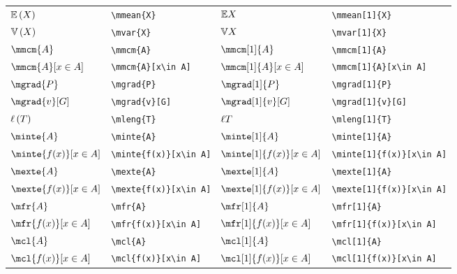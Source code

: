 \documentclass[10pt, a4paper]{article}
\newcommand{\ds}{\displaystyle}
\newcommand{\mmean}[2][0]{
	\ifthenelse{ \equal{#1}{0} }{\mathbb{E}\left( #2 \right)}{\mathbb{E}{#2}}
}
\newcommand{\mvar}[2][0]{
	\ifthenelse{ \equal{#1}{0} }{\mathbb{V}\left( #2 \right)}{\mathbb{V}{#2}}
}
\newcommand{\mleng}[2][0]{
	\ifthenelse{ \equal{#1}{0} }{\ell\left( #2 \right)}{\ell{#2}}
}
\begin{document}
\begin{center}
\begin{tabular}{ll|ll}
		$ \mmean{X} $ & \texttt{\textbackslash mmean\{X\}} & $ \mmean[1]{X} $ & \texttt{\textbackslash mmean[1]\{X\}}\\
		$ \mvar{X} $ & \texttt{\textbackslash mvar\{X\}} & $ \mvar[1]{X} $ & \texttt{\textbackslash mvar[1]\{X\}}\\
		$ \mmcm{A} $ & \texttt{\textbackslash mmcm\{A\}} & $ \mmcm[1]{A} $ & \texttt{\textbackslash mmcm[1]\{A\}}\\
		$ \ds\mmcm{A}[x\in A] $ & \texttt{\textbackslash mmcm\{A\}[x\textbackslash in A]} & $ \ds\mmcm[1]{A}[x\in A] $ & \texttt{\textbackslash mmcm[1]\{A\}[x\textbackslash in A]}\\
		$ \mgrad{P} $ & \texttt{\textbackslash mgrad\{P\}} & $ \mgrad[1]{P} $ & \texttt{\textbackslash mgrad[1]\{P\}}\\
		$ \mgrad{v}[G] $ & \texttt{\textbackslash mgrad\{v\}[G]} & $ \mgrad[1]{v}[G] $ & \texttt{\textbackslash mgrad[1]\{v\}[G]}\\
		$ \mleng{T} $ & \texttt{\textbackslash mleng\{T\}} & $ \mleng[1]{T} $ & \texttt{\textbackslash mleng[1]\{T\}}\\
		$ \minte{A} $ & \texttt{\textbackslash minte\{A\}} & $ \minte[1]{A} $ & \texttt{\textbackslash minte[1]\{A\}}\\
		$ \ds\minte{f(x)}[x\in A] $ & \texttt{\textbackslash minte\{f(x)\}[x\textbackslash in A]} & $ \ds\minte[1]{f(x)}[x\in A] $ & \texttt{\textbackslash minte[1]\{f(x)\}[x\textbackslash in A]}\\
		$ \mexte{A} $ & \texttt{\textbackslash mexte\{A\}} & $ \mexte[1]{A} $ & \texttt{\textbackslash mexte[1]\{A\}}\\
		$ \ds\mexte{f(x)}[x\in A] $ & \texttt{\textbackslash mexte\{f(x)\}[x\textbackslash in A]} & $ \ds\mexte[1]{f(x)}[x\in A] $ & \texttt{\textbackslash mexte[1]\{f(x)\}[x\textbackslash in A]}\\
		$ \mfr{A} $ & \texttt{\textbackslash mfr\{A\}} & $ \mfr[1]{A} $ & \texttt{\textbackslash mfr[1]\{A\}}\\
		$ \ds\mfr{f(x)}[x\in A] $ & \texttt{\textbackslash mfr\{f(x)\}[x\textbackslash in A]} & $ \ds\mfr[1]{f(x)}[x\in A] $ & \texttt{\textbackslash mfr[1]\{f(x)\}[x\textbackslash in A]}\\
		$ \mcl{A} $ & \texttt{\textbackslash mcl\{A\}} & $ \mcl[1]{A} $ & \texttt{\textbackslash mcl[1]\{A\}}\\
		$ \ds\mcl{f(x)}[x\in A] $ & \texttt{\textbackslash mcl\{f(x)\}[x\textbackslash in A]} & $ \ds\mcl[1]{f(x)}[x\in A] $ & \texttt{\textbackslash mcl[1]\{f(x)\}[x\textbackslash in A]}\\

\end{tabular}
\end{center}
\end{document}

